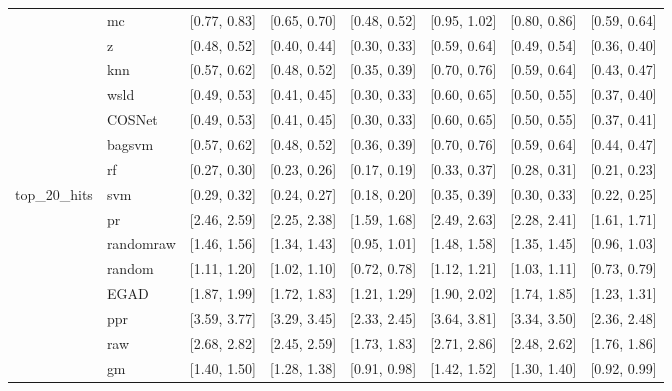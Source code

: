 \begin{table}[H]
{\begin{tabular}{llllllll}
 & mc & [0.77, 0.83] & [0.65, 0.70] & [0.48, 0.52] & [0.95, 1.02] & [0.80, 0.86] & [0.59, 0.64]\\

 & z & [0.48, 0.52] & [0.40, 0.44] & [0.30, 0.33] & [0.59, 0.64] & [0.49, 0.54] & [0.36, 0.40]\\

 & knn & [0.57, 0.62] & [0.48, 0.52] & [0.35, 0.39] & [0.70, 0.76] & [0.59, 0.64] & [0.43, 0.47]\\

 & wsld & [0.49, 0.53] & [0.41, 0.45] & [0.30, 0.33] & [0.60, 0.65] & [0.50, 0.55] & [0.37, 0.40]\\

 & COSNet & [0.49, 0.53] & [0.41, 0.45] & [0.30, 0.33] & [0.60, 0.65] & [0.50, 0.55] & [0.37, 0.41]\\

 & bagsvm & [0.57, 0.62] & [0.48, 0.52] & [0.36, 0.39] & [0.70, 0.76] & [0.59, 0.64] & [0.44, 0.47]\\

 & rf & [0.27, 0.30] & [0.23, 0.26] & [0.17, 0.19] & [0.33, 0.37] & [0.28, 0.31] & [0.21, 0.23]\\

\multirow{-15}{*}{\raggedright\arraybackslash top\_20\_hits} & svm & [0.29, 0.32] & [0.24, 0.27] & [0.18, 0.20] & [0.35, 0.39] & [0.30, 0.33] & [0.22, 0.25]\\
\cmidrule{1-8}
 & pr & [2.46, 2.59] & [2.25, 2.38] & [1.59, 1.68] & [2.49, 2.63] & [2.28, 2.41] & [1.61, 1.71]\\

 & randomraw & [1.46, 1.56] & [1.34, 1.43] & [0.95, 1.01] & [1.48, 1.58] & [1.35, 1.45] & [0.96, 1.03]\\

 & random & [1.11, 1.20] & [1.02, 1.10] & [0.72, 0.78] & [1.12, 1.21] & [1.03, 1.11] & [0.73, 0.79]\\

 & EGAD & [1.87, 1.99] & [1.72, 1.83] & [1.21, 1.29] & [1.90, 2.02] & [1.74, 1.85] & [1.23, 1.31]\\

 & ppr & [3.59, 3.77] & [3.29, 3.45] & [2.33, 2.45] & [3.64, 3.81] & [3.34, 3.50] & [2.36, 2.48]\\

 & raw & [2.68, 2.82] & [2.45, 2.59] & [1.73, 1.83] & [2.71, 2.86] & [2.48, 2.62] & [1.76, 1.86]\\

 & gm & [1.40, 1.50] & [1.28, 1.38] & [0.91, 0.98] & [1.42, 1.52] & [1.30, 1.40] & [0.92, 0.99]\\


\end{tabular}}
\end{table}
